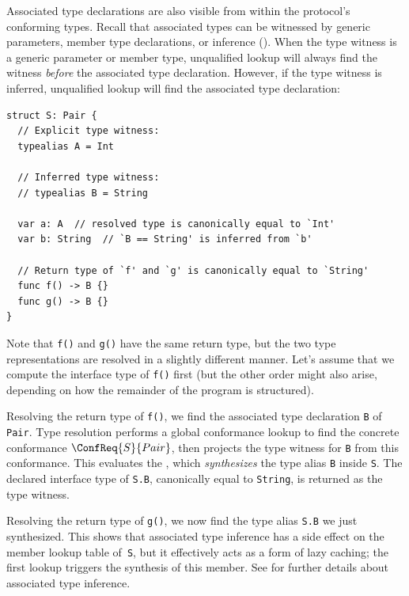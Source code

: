 \documentclass[../generics]{subfiles}
\begin{document}
Associated type declarations are also visible from within the protocol's conforming types. Recall that associated types can be witnessed by generic parameters, member type declarations, or inference (). When the type witness is a generic parameter or member type, unqualified lookup will always find the witness \emph{before} the associated type declaration. However, if the type witness is inferred, unqualified lookup will find the associated type declaration:
\begin{Verbatim}
struct S: Pair {
  // Explicit type witness:
  typealias A = Int

  // Inferred type witness:
  // typealias B = String

  var a: A  // resolved type is canonically equal to `Int'
  var b: String  // `B == String' is inferred from `b'

  // Return type of `f' and `g' is canonically equal to `String'
  func f() -> B {}
  func g() -> B {}
}
\end{Verbatim}

Note that \texttt{f()} and \texttt{g()} have the same return type, but the two type representations are resolved in a slightly different manner. Let's assume that we compute the interface type of \texttt{f()} first (but the other order might also arise, depending on how the remainder of the program is structured).

Resolving the return type of \texttt{f()}, we find the associated type declaration \texttt{B} of \texttt{Pair}. Type resolution performs a global conformance lookup to find the concrete conformance $\ConfReq{S}{Pair}$, then projects the type witness for \texttt{B} from this conformance. This evaluates the , which \emph{synthesizes} the type alias \texttt{B} inside \texttt{S}. The declared interface type of \texttt{S.B}, canonically equal to \texttt{String}, is returned as the type witness.

Resolving the return type of \texttt{g()}, we now find the type alias \texttt{S.B} we just synthesized. This shows that associated type inference has a side effect on the member lookup table of~\texttt{S}, but it effectively acts as a form of lazy caching; the first lookup triggers the synthesis of this member. See  for further details about associated type inference.
\end{document}
